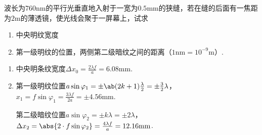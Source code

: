 \begin{problem}[弗琅禾费衍射][10]
    波长为$760\mathrm{nm}$的平行光垂直地入射于一宽为$0.5\mathrm{mm}$的狭缝，若在缝的后面有一焦距为$2\mathrm{m}$的薄透镜，使光线会聚于一屏幕上，试求
\begin{enumerate}
    \item 中央明纹宽度
    \item 第一级明纹的位置，两侧第二级暗纹之间的距离（$1\mathrm{nm}=10^{-9}\mathrm{m}$）.
\end{enumerate}
\end{problem}
\begin{solution}
    \begin{enumerate}
        \item 中央明条纹宽度$\Delta x_0=\frac{2\lambda f}{a}=6.08\mathrm{mm}$.
        \item 第一级明纹位置$a\sin{\varphi_1}=\pm\ab(2k+1)\frac{\lambda}{2}=\pm\frac32\lambda$，$x_1=f\sin{\varphi_1}=\frac{3\lambda f}{2a}=\pm 4.56\mathrm{mm}$.
        
        第二级暗纹位置$a\sin{\varphi_2}=\pm k\lambda=\pm 2\lambda$，$\Delta x_2=\abs{2\cdot f\sin\varphi_2}=\frac{4\lambda f}{a}=12.16\mathrm{mm}$.
    \end{enumerate}
\end{solution}